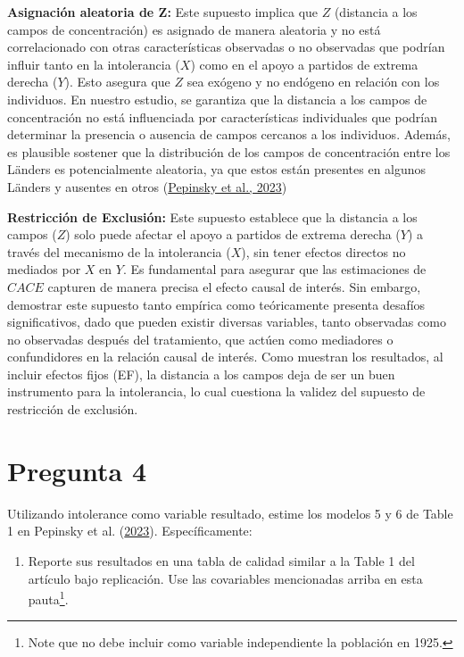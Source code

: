 \documentclass[
  12pt,
  a4paper,
]{article}
\providecommand{\tightlist}{%
  \setlength{\itemsep}{0pt}\setlength{\parskip}{0pt}}
\begin{document}
\textbf{Asignación aleatoria de Z:} Este supuesto implica que \(Z\) (distancia a los campos de concentración) es asignado de manera aleatoria y no está correlacionado con otras características observadas o no observadas que podrían influir tanto en la intolerancia (\(X\)) como en el apoyo a partidos de extrema derecha (\(Y\)). Esto asegura que \(Z\) sea exógeno y no endógeno en relación con los individuos. En nuestro estudio, se garantiza que la distancia a los campos de concentración no está influenciada por características individuales que podrían determinar la presencia o ausencia de campos cercanos a los individuos. Además, es plausible sostener que la distribución de los campos de concentración entre los Länders es potencialmente aleatoria, ya que estos están presentes en algunos Länders y ausentes en otros (\protect\hyperlink{ref-pepinsky_modeling_2023}{Pepinsky et al., 2023})

\textbf{Restricción de Exclusión:} Este supuesto establece que la distancia a los campos (\(Z\)) solo puede afectar el apoyo a partidos de extrema derecha (\(Y\)) a través del mecanismo de la intolerancia (\(X\)), sin tener efectos directos no mediados por \(X\) en \(Y\). Es fundamental para asegurar que las estimaciones de \(CACE\) capturen de manera precisa el efecto causal de interés. Sin embargo, demostrar este supuesto tanto empírica como teóricamente presenta desafíos significativos, dado que pueden existir diversas variables, tanto observadas como no observadas después del tratamiento, que actúen como mediadores o confundidores en la relación causal de interés. Como muestran los resultados, al incluir efectos fijos (EF), la distancia a los campos deja de ser un buen instrumento para la intolerancia, lo cual cuestiona la validez del supuesto de restricción de exclusión.

\hypertarget{pregunta-4}{%
\section{Pregunta 4}\label{pregunta-4}}

Utilizando intolerance como variable resultado, estime los modelos 5 y 6 de Table 1 en Pepinsky et al. (\protect\hyperlink{ref-pepinsky_modeling_2023}{2023}). Específicamente:

\begin{enumerate}
\def\labelenumi{\alph{enumi})}
\tightlist
\item
  Reporte sus resultados en una tabla de calidad similar a la Table 1 del artículo bajo replicación. Use las covariables mencionadas arriba en esta pauta\footnote{Note que no debe incluir como variable independiente la población en 1925.}.
\end{enumerate}
\end{document}
